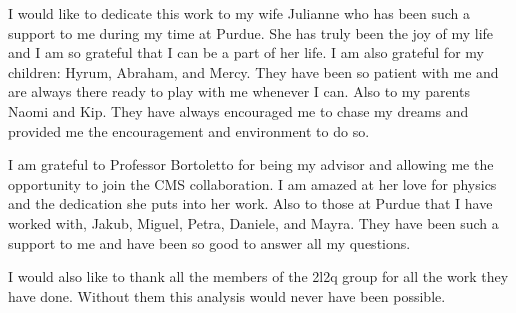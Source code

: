 %
%
%
%
%

\begin{dedication}
I would like to dedicate this work to my wife Julianne who has been such a support to me during my time at Purdue.  She has truly been the joy of my life and I am so grateful that I can be a part of her life.  I am also grateful for my children: Hyrum, Abraham, and Mercy.  They have been so patient with me and are always there ready to play with me whenever I can. Also to my parents Naomi and Kip.  They have always encouraged me to chase my dreams and provided me the encouragement and environment to do so.

I am grateful to Professor Bortoletto for being my advisor and allowing me the opportunity to join the CMS collaboration.  I am amazed at her love for physics and the dedication she puts into her work.  Also to those at Purdue that I have worked with, Jakub, Miguel, Petra, Daniele, and Mayra.  They have been such a support to me and have been so good to answer all my questions.

I would also like to thank all the members of the 2l2q group for all the work they have done.  Without them this analysis would never have been possible.


\end{dedication}



